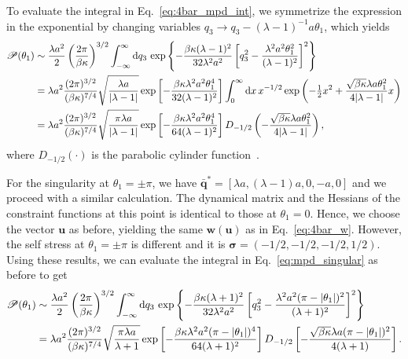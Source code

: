 To evaluate the integral in Eq.~\eqref{eq:4bar_mpd_int}, we symmetrize the expression in the exponential by changing variables $q_3 \to q_3 - (\lambda-1)^{-1}a\theta_1$, which yields
%
\begin{equation}
  \begin{aligned}
    \mathscr{P}(\theta_1) &\sim \frac{\lambda a^2}{2}\left(\frac{2\pi}{\beta\kappa}\right)^{3/2}\int_{-\infty}^{\infty} \mathrm{d} q_3\, \exp\left\{-\frac{\beta\kappa(\lambda-1)^2}{32\lambda^2 a^2}\left[q_3^2 - \frac{\lambda^2 a^2\theta_1^2}{(\lambda-1)^2}\right]^2\right\}\\
                                           &= \lambda a^2\frac{(2\pi)^{3/2}}{(\beta\kappa)^{7/4}}\sqrt{\frac{\lambda{a}}{\lvert\lambda-1\rvert}}\exp\left[-\frac{\beta\kappa\lambda^2a^2\theta_1^4}{32(\lambda-1)^2}\right]\int_{0}^{\infty} \mathrm{d} x\, x^{-1/2}\exp\left(-\tfrac{1}{2}x^2 + \frac{\sqrt{\beta\kappa}\lambda a\theta_1^2}{4\lvert\lambda-1\rvert}x\right)\\
                                           &= \lambda a^2\frac{(2\pi)^{3/2}}{(\beta\kappa)^{7/4}}\sqrt{\frac{\pi\lambda{a}}{\lvert\lambda-1\rvert}}\exp\left[-\frac{\beta\kappa\lambda^2a^2\theta_1^4}{64(\lambda-1)^2}\right]D_{-1/2}\left(-\frac{\sqrt{\beta\kappa}\lambda a\theta_1^2}{4\lvert\lambda-1\rvert}\right),
  \end{aligned}
  \label{eq:4bar_0}
\end{equation}
%
where $D_{-1/2}(\cdot)$ is the parabolic cylinder function~\cite[Eq.~12.5.1]{olver2010}.

For the singularity at $\theta_{1} = \pm\pi$, we have $\bar{\bm{q}}^{*} = [\lambda a, (\lambda-1)a, 0, -a, 0]$ and we proceed with a similar calculation.
The dynamical matrix and the Hessians of the constraint functions at this point is identical to those at $\theta_{1} = 0$.
Hence, we choose the vector $\bm{u}$ as before, yielding the same $\bm{w}(\bm{u})$ as in Eq.~\eqref{eq:4bar_w}.
However, the self stress at $\theta_1 = \pm\pi$ is different and it is $\bm{\sigma} = \left(-1/2, -1/2, -1/2, 1/2\right)$.
Using these results, we can evaluate the integral in Eq.~\eqref{eq:mpd_singular} as before to get
%
\begin{equation}
  \begin{aligned}
    \mathscr{P}(\theta_1) &\sim \frac{\lambda a^2}{2}\left(\frac{2\pi}{\beta\kappa}\right)^{3/2}\int_{-\infty}^{\infty} \mathrm{d}{q}_3\, \exp\left\{-\frac{\beta\kappa(\lambda+1)^2}{32\lambda^2 a^2}\left[q_3^2 - \frac{\lambda^2 a^2(\pi-\lvert\theta_1\rvert)^2}{(\lambda+1)^2}\right]^2\right\}\\
                                           &= \lambda a^2\frac{(2\pi)^{3/2}}{(\beta\kappa)^{7/4}}\sqrt{\frac{\pi\lambda{a}}{\lambda+1}}\exp\left[-\frac{\beta\kappa\lambda^2a^2(\pi-\lvert\theta_1\rvert)^4}{64(\lambda+1)^2}\right]D_{-1/2}\left[-\frac{\sqrt{\beta\kappa}\lambda a(\pi-\lvert\theta_1\rvert)^2}{4(\lambda+1)}\right].
  \end{aligned}
  \label{eq:4bar_pi}
\end{equation}

